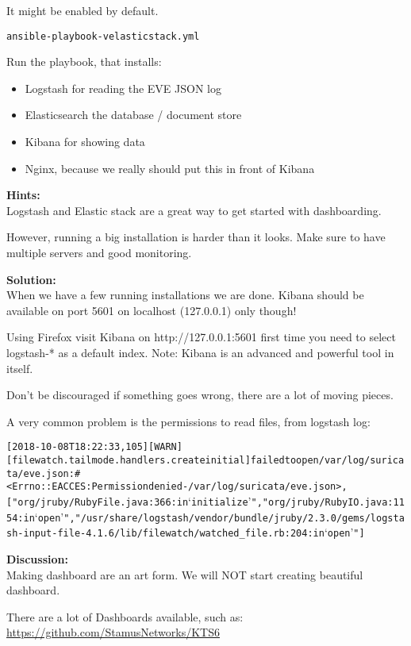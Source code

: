 \documentclass[a4paper,11pt,notitlepage]{report}
\begin{document}
It might be enabled by default.

\begin{alltt}
ansible-playbook -v elasticstack.yml
\end{alltt}

Run the playbook, that installs:
\begin{itemize}
\item Logstash for reading the EVE JSON log
\item Elasticsearch the database / document store
\item Kibana for showing data
\item Nginx, because we really should put this in front of Kibana
\end{itemize}


{\bf Hints:}\\
Logstash and Elastic stack are a great way to get started with dashboarding.

However, running a big installation is harder than it looks. Make sure to have multiple servers and good monitoring.

{\bf Solution:}\\
When we have a few running installations we are done. Kibana should be available on port 5601 on localhost (127.0.0.1) only though!

Using Firefox visit Kibana on http://127.0.0.1:5601 first time you need to
 select logstash-* as a default index. Note: Kibana is an advanced and powerful tool in itself.

Don't be discouraged if something goes wrong, there are a lot of moving pieces.

A very common problem is the permissions to read files, from logstash log:
\begin{alltt}
[2018-10-08T18:22:33,105][WARN ][filewatch.tailmode.handlers.createinitial] failed to open /var/log/suricata/eve.json: #<Errno::EACCES: Permission denied - /var/log/suricata/eve.json>, ["org/jruby/RubyFile.java:366:in `initialize'", "org/jruby/RubyIO.java:1154:in `open'", "/usr/share/logstash/vendor/bundle/jruby/2.3.0/gems/logstash-input-file-4.1.6/lib/filewatch/watched_file.rb:204:in `open'"]
\end{alltt}

{\bf Discussion:}\\
Making dashboard are an art form. We will NOT start creating beautiful dashboard.

There are a lot of Dashboards available, such as:\\
\url{https://github.com/StamusNetworks/KTS6}
\end{document}
